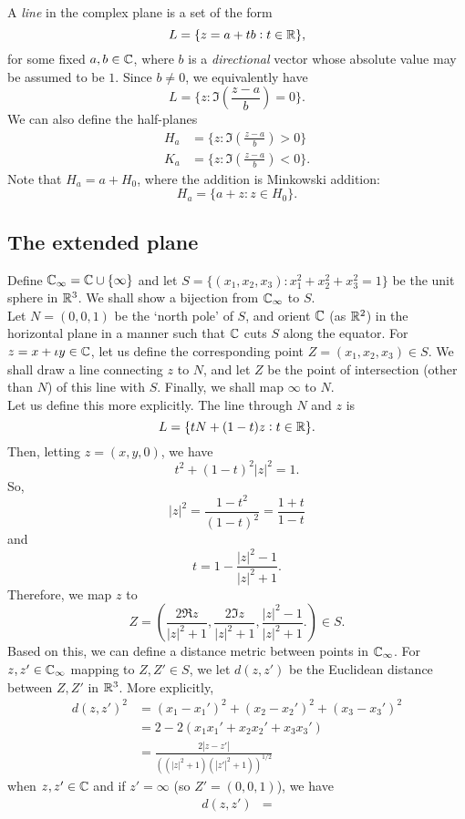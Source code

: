 	A \emph{line} in the complex plane is a set of the form
	\[ L = \{ z = a+tb : t \in \mathbb{R} \}, \]
	for some fixed $a,b\in\mathbb{C}$, where $b$ is a \emph{directional} vector whose absolute value may be assumed to be $1$. Since $b \ne 0$, we equivalently have
	\[ L = \{ z : \Im\left( \frac{z-a}{b} \right) = 0 \}. \]
	We can also define the half-planes
	\begin{align*}
		H_a &= \{ z : \Im\left( \frac{z-a}{b} \right) > 0 \} \\
		K_a &= \{ z : \Im\left( \frac{z-a}{b} \right) < 0 \}.
	\end{align*}
	Note that $H_a = a + H_0$, where the addition is Minkowski addition:
	\[ H_a = \{ a + z : z \in H_0 \}. \]

\subsection{The extended plane}
	
	Define $\mathbb{C}_\infty = \mathbb{C} \cup \{\infty\}$ and let $S = \{(x_1,x_2,x_3) : x_1^2 + x_2^2 + x_3^2 = 1\}$ be the unit sphere in $\mathbb{R}^3$. We shall show a bijection from $\mathbb{C}_\infty$ to $S$.\\
	Let $N = (0,0,1)$ be the `north pole' of $S$, and orient $\mathbb{C}$ (as $\mathbb{R}^2$) in the horizontal plane in a manner such that $\mathbb{C}$ cuts $S$ along the equator. For $z = x + \iota y \in \mathbb{C}$, let us define the corresponding point $Z = (x_1,x_2,x_3) \in S$. We shall draw a line connecting $z$ to $N$, and let $Z$ be the point of intersection (other than $N$) of this line with $S$. Finally, we shall map $\infty$ to $N$.\\
	Let us define this more explicitly. The line through $N$ and $z$ is
	\[ L = \{ tN + (1-t)z : t \in \mathbb{R} \}. \]
	Then, letting $z = (x,y,0)$, we have
	\[ t^2 + (1-t)^2 |z|^2 = 1. \]
	So,
	\[ |z|^2 = \frac{1-t^2}{(1-t)^2} = \frac{1+t}{1-t} \]
	and
	\[ t = 1 - \frac{|z|^2-1}{|z|^2+1}. \]
	Therefore, we map $z$ to
	\[ Z = \left( \frac{2 \Re z}{|z|^2+1} , \frac{2 \Im z}{|z|^2+1} , \frac{|z|^2-1}{|z|^2+1}. \right) \in S. \]
	Based on this, we can define a distance metric between points in $\mathbb{C}_\infty$. For $z,z' \in \mathbb{C}_\infty$ mapping to $Z,Z' \in S$, we let $d(z,z')$ be the Euclidean distance between $Z,Z'$ in $\mathbb{R}^3$. More explicitly,
	\begin{align*}
		d(z,z')^2 &= (x_1 - x_1')^2 + (x_2 - x_2')^2 + (x_3 - x_3')^2 \\
			&= 2 - 2(x_1x_1' + x_2x_2' + x_3x_3') \\
			&= \frac{2|z-z'|}{\left((|z|^2+1) (|z'|^2+1)\right)^{1/2}}
	\end{align*}
	when $z,z'\in\mathbb{C}$ and if $z' = \infty$ (so $Z' = (0,0,1)$), we have
	\begin{align*}
		d(z,z') &= 
	\end{align*}

